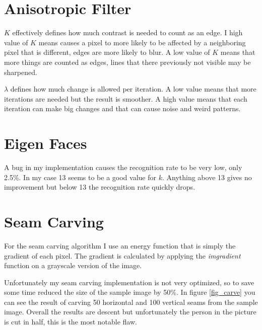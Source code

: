 \documentclass[12pt]{article}
\begin{document}
\section{Anisotropic Filter}

$K$ effectively defines how much contrast is needed to count as an edge. I high value of $K$ means causes a pixel to more likely to be affected by a neighboring pixel that is different, edges are more likely to blur. A low value of $K$ means that more things are counted as edges, lines that there previously not visible may be sharpened.

$\lambda$ defines how much change is allowed per iteration. A low value means that more iterations are needed but the result is smoother. A high value means that each iteration can make big changes and that can cause noise and weird patterns. 

\section{Eigen Faces}

A bug in my implementation causes the recognition rate to be very low, only 2.5\%. In my case 13 seems to be a good value for $k$. Anything above 13 gives no improvement but below 13 the recognition rate quickly drops.


\section{Seam Carving}

For the seam carving algorithm I use an energy function that is simply the gradient of each pixel. The gradient is calculated by applying the \textit{imgradient} function on a grayscale version of the image.

Unfortunately my seam carving implementation is not very optimized, so to save some time reduced the size of the sample image by 50\%.
In figure \ref{fig_carve} you can see the result of carving 50 horizontal and 100 vertical seams from the sample image. Overall the results are descent but unfortunately the person in the picture is cut in half, this is the most notable flaw. 
\end{document}

